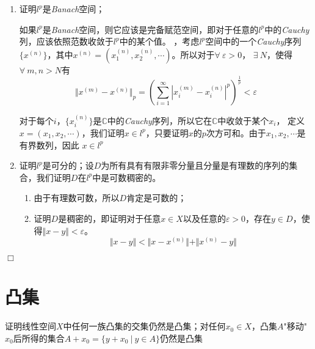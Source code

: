 \begin{enumerate}[itemindent=2em]
    \item 证明$l^p$是\textsl{Banach}空间；
    
    如果$l^p$是\textsl{Banach}空间，则它应该是完备赋范空间，即对于任意的$l^p$中的\textsl{Cauchy}列，应该依照范数收敛于$l^p$中的某个值。
    ，考虑$l^p$空间中的一个\textsl{Cauchy}序列$\{x^{(n)}\}$，其中$x^{(n)}=(x^{(n)}_1,x^{(n)}_2,\cdots)$。所以对于$\forall\ \varepsilon>0$，
    $\exists\ N$，使得$\forall\ m,n>N$有
    \begin{equation}
        \Vert x^{(m)}-x^{(n)}\Vert_p=\left(\sum_{i=1}^{\infty}|x^{(m)}_i-x^{(n)}_i|^p\right)^{\frac{1}{p}}<\varepsilon
    \end{equation}

    对于每个$i$，$\{x^{(n)}_i\}$是$\mathbb{C}$中的\textsl{Cauchy}序列，所以它在$\mathbb{C}$中收敛于某个$x_i$，
    定义$x=(x_1,x_2,\cdots)$，我们证明$x\in l^p$，只要证明$x$的$p$次方可和。由于$x_1,x_2,\cdots$是有界数列，因此
    $x\in l^p$

    \item 证明$l^p$是可分的；设$D$为所有具有有限非零分量且分量是有理数的序列的集合，我们证明$D$在$l^p$中是可数稠密的。
    \begin{enumerate}[itemindent=2em]
        \item 由于有理数可数，所以$D$肯定是可数的；
        \item 证明$D$是稠密的，即证明对于任意$x\in X$以及任意的$\varepsilon>0$，存在$y\in D$，使得$\Vert x-y\Vert<\varepsilon$。
        \begin{equation}
            \Vert x-y\Vert<\Vert x-x^{(n)}\Vert+\Vert x^{(n)}-y\Vert
        \end{equation}
    \end{enumerate}
\end{enumerate}

$\Box$

\section{凸集}

\begin{mdframed}
    \begin{question}
        证明线性空间$X$中任何一族凸集的交集仍然是凸集；对任何$x_0\in X$，凸集$A$"移动"$x_0$后所得的集合$A+x_0=\{y+x_0\ |\ y\in A\}$仍然是凸集
    \end{question}
\end{mdframed}

